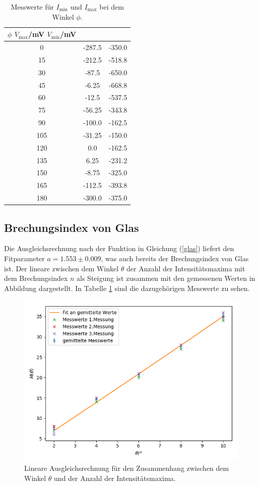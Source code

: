 \begin{table}
  \caption{Messwerte für $I_\text{min}$ und $I_\text{max}$ bei dem Winkel $\phi$.}
  \label{tab:glas}
  \centering
  \begin{tabular}{c|c|c}
    $\phi$ $V_\text{max}$/mV  $V_\text{min}$/mV \\ \midrule
    0 & -287.5  & -350.0 \\
    15 & -212.5 &  -518.8 \\
    30  & -87.5 & -650.0 \\
    45  & -6.25 & -668.8 \\
    60  & -12.5 & -537.5 \\
    75  & -56.25  & -343.8 \\
    90  & -100.0  & -162.5 \\
    105 & -31.25  & -150.0 \\
    120 & 0.0 & -162.5 \\
    135 & 6.25  & -231.2 \\
    150 & -8.75 & -325.0 \\
    165 & -112.5  & -393.8 \\
    180 & -300.0  & -375.0 \\
  \end{tabular}
\end{table}

\subsection{Brechungsindex von Glas}

Die Ausgleichsrechnung nach der Funktion in Gleichung (\ref{glas})
liefert den Fitparameter $a = 1.553 \pm 0.009$, was auch bereits der Brechungsindex von Glas ist.
Der lineare zwischen dem Winkel $\theta$ der Anzahl der Intensitätsmaxima mit dem Brechungsindex $n$
als Steigung ist zusammen mit den gemessenen Werten in Abbildung dargestellt. In Tabelle \ref{tab:glas}
sind die dazugehörigen Messwerte zu sehen.

\begin{figure}[h]
\centering
\includegraphics[width=\linewidth]{img/n_glas.png}
\caption{Lineare Ausgleichsrechnung für den Zusammenhang zwischen dem Winkel $\theta$ und der Anzahl
der Intensitätsmaxima.}
\label{n_glas}
\end{figure}

